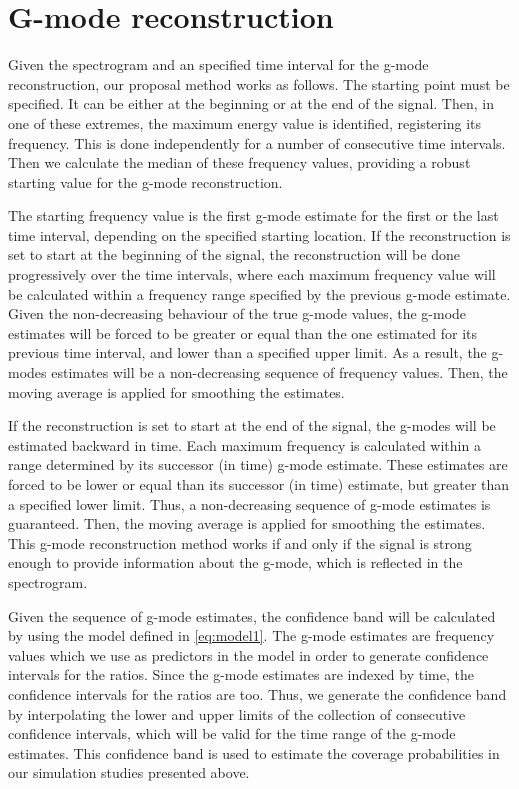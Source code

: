 \section{G-mode reconstruction}
\label{app:gmode}
Given the spectrogram and an specified time interval for the g-mode reconstruction, our proposal method works as follows.  The starting point must be specified.  It can be either at the beginning or at the end of the signal.  Then, in one of these extremes, the maximum energy value is identified, registering its frequency.  This is done independently for a number of consecutive time intervals.  Then we calculate the median of these frequency values, providing a robust starting value for the g-mode reconstruction.

The starting frequency value is the first g-mode estimate for the first or the last time interval, depending on the specified starting location.  If the reconstruction is set to start at the beginning of the signal, the reconstruction will be done progressively over the time intervals, where each maximum frequency value will be calculated within a frequency range specified by the previous g-mode estimate.  Given the non-decreasing behaviour of the true g-mode values, the g-mode estimates will be forced to be greater or equal than the one estimated for its previous time interval, and lower than a specified upper limit.  As a result, the g-modes estimates will be a non-decreasing sequence of frequency values. Then, the moving average is applied for smoothing the estimates.

If the reconstruction is set to start at the end of the signal, the g-modes will be estimated backward in time.  Each maximum frequency is calculated within a range determined by its successor (in time) g-mode estimate.  These estimates are forced to be lower or equal than its successor (in time) estimate, but greater than a specified lower limit. Thus, a non-decreasing sequence of g-mode estimates is guaranteed.  Then, the moving average is applied for smoothing the estimates. This g-mode reconstruction method works if and only if the signal is strong enough to provide information about the g-mode, which is reflected in the spectrogram.


Given the sequence of g-mode estimates, the confidence band will be calculated by using the model defined in \eqref{eq:model1}. The g-mode estimates are frequency values which we use as predictors in the model in order to generate confidence intervals for the ratios. Since the g-mode estimates are indexed by time, the confidence intervals for the ratios are too.  Thus, we generate the confidence band by interpolating the lower and upper limits of the collection of consecutive confidence intervals, which will be valid for the time range of the g-mode estimates.  This confidence band is used to estimate the coverage probabilities in our simulation studies presented above.  
